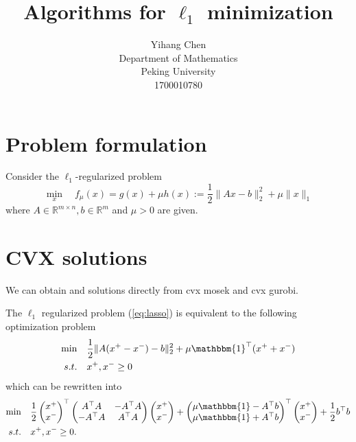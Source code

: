 \documentclass{article}
\title{Algorithms for $\ell_1$ minimization}
\author{%
  Yihang Chen \\
  Department of Mathematics\\
  Peking University\\
  1700010780\\
}
\numberwithin{equation}{section}
\numberwithin{figure}{section}
\begin{document}
\maketitle
\section{Problem formulation}

\begin{tcolorbox}[colback=blue!5!white,colframe=blue!75!black,title= Lasso]
Consider the $\ell_1$-regularized problem
\begin{equation}
    \min_x\quad f_\mu(x) = g(x)+\mu h(x):= \frac{1}{2}\|Ax-b\|_2^2+\mu\|x\|_1 \label{eq:lasso}
\end{equation}
where $A\in \mathbb{R}^{m\times n},b\in \mathbb{R}^m$ and $\mu>0$ are given.
\end{tcolorbox}

\section{CVX solutions}
We can obtain and solutions directly from cvx mosek and cvx gurobi. 

The $\ell_1$ regularized problem (\ref{eq:lasso}) is equivalent to the following optimization problem
\begin{equation}
\begin{split}
        \min&\quad \frac{1}{2}\|A(x^+-x^-)-b\|_2^2+\mu \mathbbm{1}^\top (x^+ + x^-)\\
        s.t.&\quad x^+,x^-\geq 0
\end{split}\label{eq:reformation1}
\end{equation}
which can be rewritten into
\begin{equation}
    \begin{split}
        \min &\quad \frac{1}{2}\left(\begin{matrix} x^+ \\ x^- \end{matrix}
\right)^\top \left(\begin{matrix} A^\top A& -A^\top A \\-A^\top A & A^\top A \end{matrix}
\right) \left(\begin{matrix} x^+ \\ x^- \end{matrix}
\right) + \left(\begin{matrix} \mu \mathbbm{1}-A^\top b\\ \mu \mathbbm{1}+A^\top b \end{matrix}
\right)^\top \left(\begin{matrix} x^+ \\ x^- \end{matrix}
\right)+\frac{1}{2}b^\top b\\
        s.t.&\quad x^+,x^-\geq 0.
    \end{split}
\end{equation}
\end{document}

